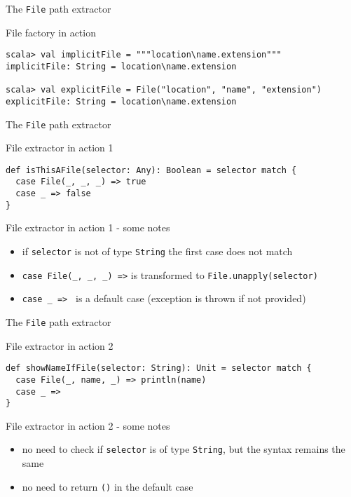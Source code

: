 \begin{frame}[fragile]{The \lstinline!File! path extractor}
\begin{exampleblock}{File factory in action}
\begin{lstlisting}
scala> val implicitFile = """location\name.extension"""
implicitFile: String = location\name.extension

scala> val explicitFile = File("location", "name", "extension")
explicitFile: String = location\name.extension
\end{lstlisting}
\end{exampleblock}
\end{frame}

\begin{frame}[fragile]{The \lstinline!File! path extractor}
\begin{exampleblock}{File extractor in action 1}
\begin{lstlisting}
def isThisAFile(selector: Any): Boolean = selector match {
  case File(_, _, _) => true
  case _ => false
}
\end{lstlisting}
\end{exampleblock}
\pause
\begin{block}{File extractor in action 1 - some notes}
\begin{itemize}
  \item if \lstinline!selector! is not of type \lstinline!String! the first case does not match
  \item \lstinline!case File(_, _, _) =>! is transformed to \lstinline!File.unapply(selector)!
  \item \lstinline!case _ => ! is a default case (exception is thrown if not provided)
\end{itemize}
\end{block}
\end{frame}

\begin{frame}[fragile]{The \lstinline!File! path extractor}
\begin{exampleblock}{File extractor in action 2}
\begin{lstlisting}
def showNameIfFile(selector: String): Unit = selector match {
  case File(_, name, _) => println(name)
  case _ =>
}
\end{lstlisting}
\end{exampleblock}
\pause
\begin{block}{File extractor in action 2 - some notes}
\begin{itemize}
  \item no need to check if \lstinline!selector! is of type \lstinline!String!,
  but the syntax remains the same
  \item no need to return \lstinline!()! in the default case
\end{itemize}
\end{block}
\end{frame}

